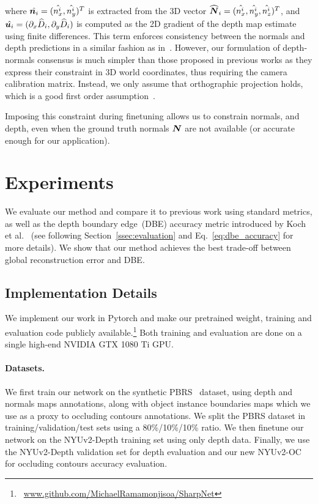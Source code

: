 \documentclass[10pt,twocolumn,letterpaper]{article}
\begin{document}
where $\hat{\boldsymbol{n}_i} =(\hat{n_x^i}, \hat{n_y^i})^T$ is extracted from the
3D vector $\widehat{\boldsymbol{N}}_i=(\hat{n_x^i}, \hat{n_y^i}, \hat{n_z^i})^T$, and 
$\hat{\boldsymbol{u}_i}=(\partial_x \widehat{D}_i, \partial_y \widehat{D}_i)$ is computed as the 2D 
gradient of the depth map estimate using finite differences. This term enforces 
consistency between the normals and depth predictions in a similar fashion as 
in~\cite{WangSurgeNIPS16, Yang2018lego, Fei2018GeoSupervisedVD}.
However, our formulation of depth-normals consensus is much simpler than those 
proposed in previous works as they express their constraint in 3D world 
coordinates, thus requiring the camera calibration matrix. Instead, we only 
assume that orthographic projection holds, which is a good first order 
assumption~\cite{Wu_LineIntegration88}.

Imposing this constraint during finetuning allows us to
constrain normals, and depth, even when the ground truth
normals $\boldsymbol{N}$ are not available (or accurate enough for our application).
 
\section{Experiments}



We evaluate our  method and compare it to previous  work using standard metrics,
as well as the depth boundary  edge~(DBE) accuracy  metric introduced by  Koch 
et al.~\cite{Koch2018EvaluationOC}  (see  following  
Section~\ref{ssec:evaluation} and Eq.~\eqref{eq:dbe_accuracy} for more 
details).  We show that our method
achieves the best trade-off  between global reconstruction error and DBE.

\subsection{Implementation Details}\label{ssec:implementation}

We implement our work in Pytorch and make our pretrained weight, training and 
evaluation code publicly 
available.\footnote{~\url{www.github.com/MichaelRamamonjisoa/SharpNet}} 
Both training and evaluation are done on a single high-end NVIDIA GTX 1080 Ti 
GPU.

\paragraph{Datasets.}
We first train our network on the synthetic PBRS~\cite{Zhang2016pbrs} dataset, 
using depth and normals maps annotations, along with object instance boundaries 
maps which we use as a proxy to occluding contours annotations. We split the 
PBRS dataset in \mbox{training/validation/test} sets using a 80\%/10\%/10\% 
ratio. We then finetune our network on the NYUv2-Depth training set using only 
depth data. Finally, we use the NYUv2-Depth validation set for depth evaluation 
and our new NYUv2-OC for occluding contours accuracy evaluation.
\end{document}
